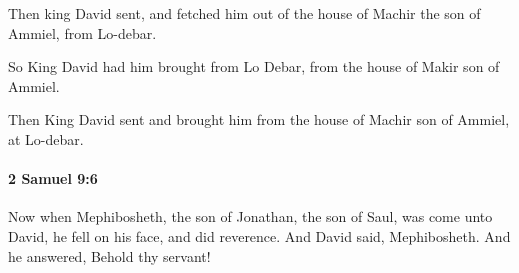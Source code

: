 			\begin{versebox}
					\item[BHS] 
					\item[ASV] Then king David sent, and fetched him out of the house of Machir the son of Ammiel, from Lo-debar.
					\item[NIV] So King David had him brought from Lo Debar, from the house of Makir son of Ammiel.
					\item[NRSV] Then King David sent and brought him from the house of Machir son of Ammiel, at Lo-debar.
			\end{versebox}

		\paragraph{2 Samuel 9:6} %
			\label{2SAMUEL-9-6}

			Now when Mephibosheth, the son of Jonathan, the son of Saul, was come unto David, he fell on his face, and did reverence. And David said, Mephibosheth. And he answered, Behold thy servant!

